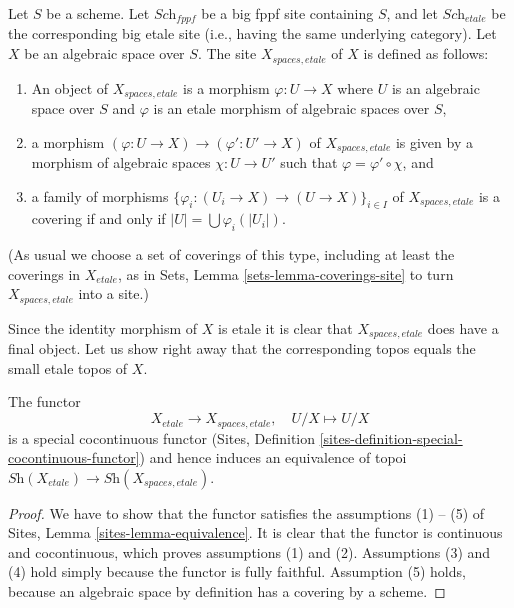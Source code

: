 \begin{definition}
\label{definition-spaces-etale-site}
Let $S$ be a scheme.
Let $\textit{Sch}_{fppf}$ be a big fppf site containing $S$,
and let $\textit{Sch}_{etale}$ be the corresponding big etale site
(i.e., having the same underlying category).
Let $X$ be an algebraic space over $S$.
The site {\it $X_{spaces, etale}$} of $X$ is defined as follows:
\begin{enumerate}
\item An object of $X_{spaces, etale}$ is a morphism $\varphi : U \to X$
where $U$ is an algebraic space over $S$ and
$\varphi$ is an etale morphism of algebraic spaces over $S$,
\item a morphism $(\varphi : U \to X) \to (\varphi' : U' \to X)$ of
$X_{spaces, etale}$ is given by a morphism of algebraic spaces
$\chi : U \to U'$ such that $\varphi = \varphi' \circ \chi$, and
\item a family of morphisms
$\{\varphi_i : (U_i \to X) \to (U \to X)\}_{i \in I}$
of $X_{spaces, etale}$ is a covering if and only if
$|U| = \bigcup \varphi_i(|U_i|)$.
\end{enumerate}
(As usual we choose a set of coverings of this type, including at least
the coverings in $X_{etale}$, as in Sets, Lemma \ref{sets-lemma-coverings-site}
to turn $X_{spaces, etale}$ into a site.)
\end{definition}

\noindent
Since the identity morphism of $X$ is etale it is clear that
$X_{spaces, etale}$ does have a final object.
Let us show right away that the corresponding topos equals the
small etale topos of $X$.

\begin{lemma}
\label{lemma-compare-etale-sites}
The functor
$$
X_{etale} \longrightarrow X_{spaces, etale}, \quad
U/X \longmapsto U/X
$$
is a special cocontinuous functor
(Sites, Definition \ref{sites-definition-special-cocontinuous-functor})
and hence induces an equivalence of topoi
$\textit{Sh}(X_{etale}) \to \textit{Sh}(X_{spaces, etale})$.
\end{lemma}

\begin{proof}
We have to show that the functor satisfies the assumptions (1) -- (5) of
Sites, Lemma \ref{sites-lemma-equivalence}.
It is clear that the functor is continuous and cocontinuous, which
proves assumptions (1) and (2).
Assumptions (3) and (4) hold simply because the functor is fully faithful.
Assumption (5) holds, because an algebraic space by definition has
a covering by a scheme.
\end{proof}

